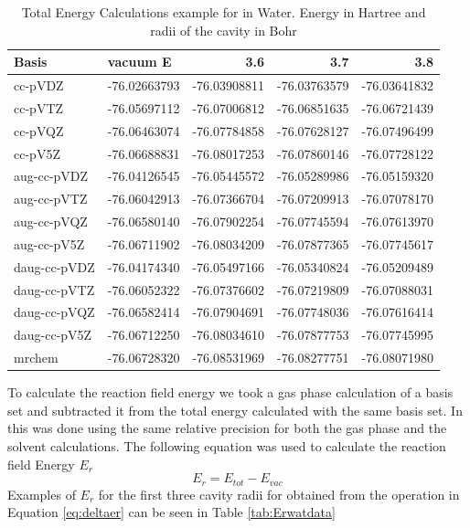 \documentclass[../master_thesis.tex]{subfiles}
\begin{document}
\begin{table}[htbp]
\caption[$E_{tot}$ for  in Water sample]{Total Energy Calculations example for  in Water. Energy in Hartree and radii of the cavity in Bohr}
\begin{tabular}{l|r|r|r|r}
Basis & \multicolumn{1}{l|}{vacuum E} & 3.6 & 3.7 & 3.8 \\ \hline
cc-pVDZ & -76.02663793 & -76.03908811 & -76.03763579 & -76.03641832 \\
cc-pVTZ & -76.05697112 & -76.07006812 & -76.06851635 & -76.06721439 \\
cc-pVQZ & -76.06463074 & -76.07784858 & -76.07628127 & -76.07496499 \\
cc-pV5Z & -76.06688831 & -76.08017253 & -76.07860146 & -76.07728122 \\ \hline
aug-cc-pVDZ & -76.04126545 & -76.05445572 & -76.05289986 & -76.05159320 \\
aug-cc-pVTZ & -76.06042913 & -76.07366704 & -76.07209913 & -76.07078170 \\
aug-cc-pVQZ & -76.06580140 & -76.07902254 & -76.07745594 & -76.07613970 \\
aug-cc-pV5Z & -76.06711902 & -76.08034209 & -76.07877365 & -76.07745617 \\ \hline
daug-cc-pVDZ & -76.04174340 & -76.05497166 & -76.05340824 & -76.05209489 \\
daug-cc-pVTZ & -76.06052322 & -76.07376602 & -76.07219809 & -76.07088031 \\
daug-cc-pVQZ & -76.06582414 & -76.07904691 & -76.07748036 & -76.07616414 \\
daug-cc-pV5Z & -76.06712250 & -76.08034610 & -76.07877753 & -76.07745995 \\ \hline
mrchem & -76.06728320 & -76.08531969 & -76.08277751 & -76.08071980 \\
\end{tabular}
\label{tab:rawwaterdata}
\end{table}


To calculate the reaction field energy we took a gas phase calculation
of a basis set and subtracted it from the total energy calculated with the same
basis set. In \mrchem this was done using the same relative precision for both
the gas phase and the solvent calculations. The following equation was used to
calculate the reaction field Energy $E_r$
\begin{equation}\label{eq:deltaer}
  E_r = E_{tot} - E_{vac}
\end{equation}
Examples of $E_r$ for the first three cavity radii for  obtained from the operation
in Equation \ref{eq:deltaer} can be seen in Table \ref{tab:Erwatdata}
\end{document}
